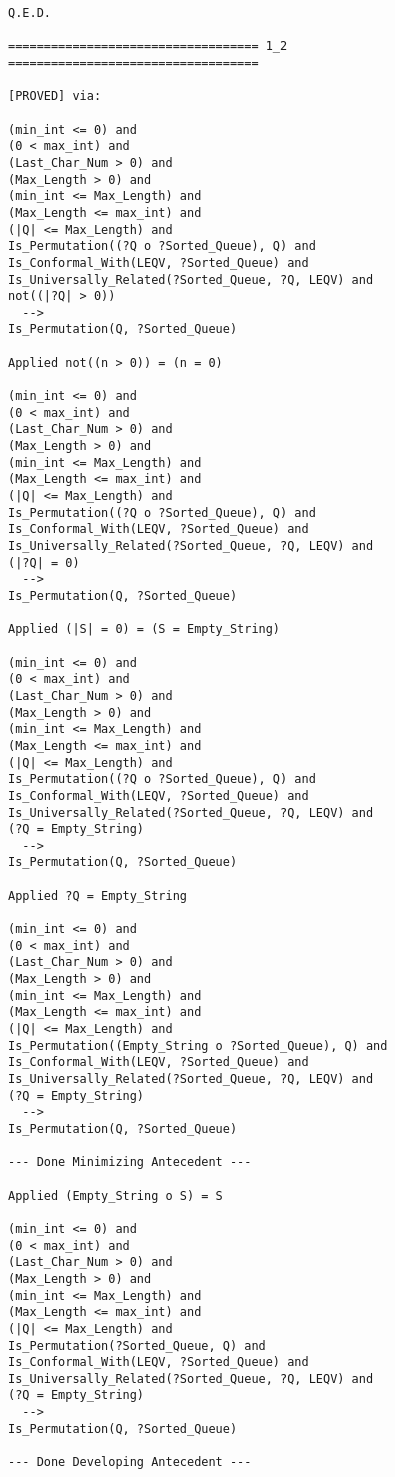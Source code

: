 \begin{lstlisting}[language=resolve]
Q.E.D.

=================================== 1_2 ===================================

[PROVED] via:

(min_int <= 0) and
(0 < max_int) and
(Last_Char_Num > 0) and
(Max_Length > 0) and
(min_int <= Max_Length) and
(Max_Length <= max_int) and
(|Q| <= Max_Length) and
Is_Permutation((?Q o ?Sorted_Queue), Q) and
Is_Conformal_With(LEQV, ?Sorted_Queue) and
Is_Universally_Related(?Sorted_Queue, ?Q, LEQV) and
not((|?Q| > 0))
  -->
Is_Permutation(Q, ?Sorted_Queue)

Applied not((n > 0)) = (n = 0)

(min_int <= 0) and
(0 < max_int) and
(Last_Char_Num > 0) and
(Max_Length > 0) and
(min_int <= Max_Length) and
(Max_Length <= max_int) and
(|Q| <= Max_Length) and
Is_Permutation((?Q o ?Sorted_Queue), Q) and
Is_Conformal_With(LEQV, ?Sorted_Queue) and
Is_Universally_Related(?Sorted_Queue, ?Q, LEQV) and
(|?Q| = 0)
  -->
Is_Permutation(Q, ?Sorted_Queue)

Applied (|S| = 0) = (S = Empty_String)

(min_int <= 0) and
(0 < max_int) and
(Last_Char_Num > 0) and
(Max_Length > 0) and
(min_int <= Max_Length) and
(Max_Length <= max_int) and
(|Q| <= Max_Length) and
Is_Permutation((?Q o ?Sorted_Queue), Q) and
Is_Conformal_With(LEQV, ?Sorted_Queue) and
Is_Universally_Related(?Sorted_Queue, ?Q, LEQV) and
(?Q = Empty_String)
  -->
Is_Permutation(Q, ?Sorted_Queue)

Applied ?Q = Empty_String

(min_int <= 0) and
(0 < max_int) and
(Last_Char_Num > 0) and
(Max_Length > 0) and
(min_int <= Max_Length) and
(Max_Length <= max_int) and
(|Q| <= Max_Length) and
Is_Permutation((Empty_String o ?Sorted_Queue), Q) and
Is_Conformal_With(LEQV, ?Sorted_Queue) and
Is_Universally_Related(?Sorted_Queue, ?Q, LEQV) and
(?Q = Empty_String)
  -->
Is_Permutation(Q, ?Sorted_Queue)

--- Done Minimizing Antecedent ---

Applied (Empty_String o S) = S

(min_int <= 0) and
(0 < max_int) and
(Last_Char_Num > 0) and
(Max_Length > 0) and
(min_int <= Max_Length) and
(Max_Length <= max_int) and
(|Q| <= Max_Length) and
Is_Permutation(?Sorted_Queue, Q) and
Is_Conformal_With(LEQV, ?Sorted_Queue) and
Is_Universally_Related(?Sorted_Queue, ?Q, LEQV) and
(?Q = Empty_String)
  -->
Is_Permutation(Q, ?Sorted_Queue)

--- Done Developing Antecedent ---


\end{lstlisting}
